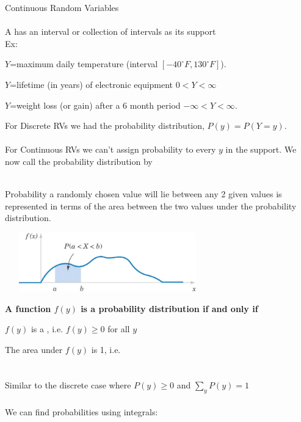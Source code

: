 \pagebreak

\huge Continuous Random Variables\\\normalsize~\\
A \underbar{~~~~~~~~~~~~~~~~~~~~~~~~~~~~~~~~~~~~~~~~~~~~~~~} has an interval or collection of intervals as its support\\
Ex:
\bi
\item $Y$=maximum daily temperature (interval $[-40^\circ F, 130^\circ F]$).
\item $Y$=lifetime (in years) of electronic equipment $0 <Y <\infty$
\item $Y$=weight loss (or gain) after a 6 month period $-\infty < Y < \infty$.
\ei

For Discrete RVs we had the probability distribution, $P(y)=P(Y=y)$.\\~\\
For Continuous RVs we can't assign probability to every $y$ in the support.  We now call the probability distribution by \\~\\

\bi
\item Probability a randomly chosen value will lie between any 2 given values is represented in terms of the area between the two values under the probability distribution.
\ei
\begin{center}
\includegraphics[width=3.5in, height=1in]{chapter4/pdf.jpg}\\
\end{center}

\textbf{A function $f(y)$ is a probability distribution if and only if}\\
\be
\item $f(y)$ is a \underbar{~~~~~~~~~~~~~~~~~~~~~~~~~~~~~~~~~~~~~~~~~~~~~~~~~~~~~~~}, i.e. $f(y)\geq 0$ for all $y$
\item The area under $f(y)$ is 1, i.e.\\~\\~\\
\ee
Similar to the discrete case where $P(y)\geq 0$ and $\sum_{y}P(y)=1$\\~\\
We can find probabilities using integrals:

